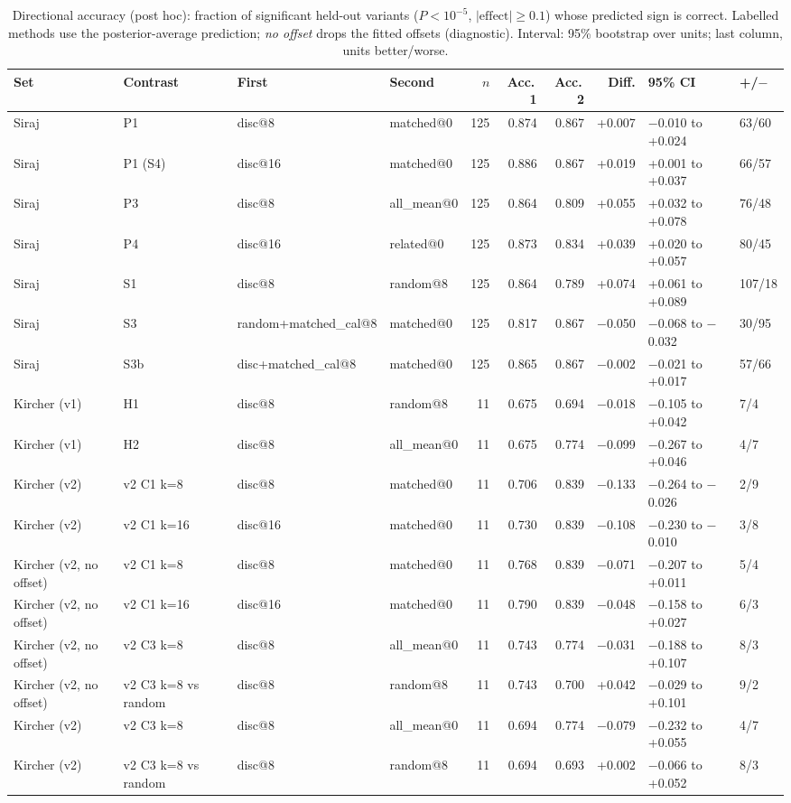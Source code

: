 \begin{table}[H]
\caption{Directional accuracy (post hoc): fraction of significant held-out variants ($P<10^{-5}$, $|\text{effect}|\ge0.1$) whose predicted sign is correct. Labelled methods use the posterior-average prediction; \emph{no offset} drops the fitted offsets (diagnostic). Interval: 95\% bootstrap over units; last column, units better/worse.}\label{tab:s2}
\centering\small
\begin{tabular}{llllrrrrll}
\toprule
Set & Contrast & First & Second & $n$ & Acc.\,1 & Acc.\,2 & Diff. & 95\% CI & +/$-$ \\
\midrule
Siraj & P1 & disc@8 & matched@0 & 125 & 0.874 & 0.867 & +0.007 & $-$0.010 to +0.024 & 63/60 \\
Siraj & P1 (S4) & disc@16 & matched@0 & 125 & 0.886 & 0.867 & +0.019 & +0.001 to +0.037 & 66/57 \\
Siraj & P3 & disc@8 & all\_mean@0 & 125 & 0.864 & 0.809 & +0.055 & +0.032 to +0.078 & 76/48 \\
Siraj & P4 & disc@16 & related@0 & 125 & 0.873 & 0.834 & +0.039 & +0.020 to +0.057 & 80/45 \\
Siraj & S1 & disc@8 & random@8 & 125 & 0.864 & 0.789 & +0.074 & +0.061 to +0.089 & 107/18 \\
Siraj & S3 & random+matched\_cal@8 & matched@0 & 125 & 0.817 & 0.867 & $-$0.050 & $-$0.068 to $-$0.032 & 30/95 \\
Siraj & S3b & disc+matched\_cal@8 & matched@0 & 125 & 0.865 & 0.867 & $-$0.002 & $-$0.021 to +0.017 & 57/66 \\
Kircher (v1) & H1 & disc@8 & random@8 & 11 & 0.675 & 0.694 & $-$0.018 & $-$0.105 to +0.042 & 7/4 \\
Kircher (v1) & H2 & disc@8 & all\_mean@0 & 11 & 0.675 & 0.774 & $-$0.099 & $-$0.267 to +0.046 & 4/7 \\
Kircher (v2) & v2 C1 k=8 & disc@8 & matched@0 & 11 & 0.706 & 0.839 & $-$0.133 & $-$0.264 to $-$0.026 & 2/9 \\
Kircher (v2) & v2 C1 k=16 & disc@16 & matched@0 & 11 & 0.730 & 0.839 & $-$0.108 & $-$0.230 to $-$0.010 & 3/8 \\
Kircher (v2, no offset) & v2 C1 k=8 & disc@8 & matched@0 & 11 & 0.768 & 0.839 & $-$0.071 & $-$0.207 to +0.011 & 5/4 \\
Kircher (v2, no offset) & v2 C1 k=16 & disc@16 & matched@0 & 11 & 0.790 & 0.839 & $-$0.048 & $-$0.158 to +0.027 & 6/3 \\
Kircher (v2, no offset) & v2 C3 k=8 & disc@8 & all\_mean@0 & 11 & 0.743 & 0.774 & $-$0.031 & $-$0.188 to +0.107 & 8/3 \\
Kircher (v2, no offset) & v2 C3 k=8 vs random & disc@8 & random@8 & 11 & 0.743 & 0.700 & +0.042 & $-$0.029 to +0.101 & 9/2 \\
Kircher (v2) & v2 C3 k=8 & disc@8 & all\_mean@0 & 11 & 0.694 & 0.774 & $-$0.079 & $-$0.232 to +0.055 & 4/7 \\
Kircher (v2) & v2 C3 k=8 vs random & disc@8 & random@8 & 11 & 0.694 & 0.693 & +0.002 & $-$0.066 to +0.052 & 8/3 \\
\bottomrule
\end{tabular}
\end{table}

